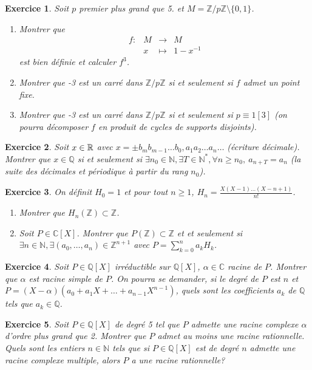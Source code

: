 \documentclass[12pt]{article}
\newtheorem{exercise}{Exercice}[section]
\theoremstyle{remark}
\theoremstyle{remark}
\newcommand{\C}{\mathbb{C}} \newcommand{\Q}{\mathbb{Q}}
\newcommand{\N}{\mathbb{N}} \newcommand{\Z}{\mathbb{Z}}
\newcommand{\function}[5]{
	$$
	\begin{array}{rccl}
		#1: & #2 & \to & #3 \\
		& #4 & \mapsto & #5
	\end{array}
	$$
}
\begin{document}
\begin{exercise}
	Soit $p$ premier plus grand que 5. et $M=\Z/p\Z\setminus\{0,1\}$.
	\begin{enumerate}
		\item
		Montrer que \function{f}{M}{M}{x}{1-x^{-1}} est bien définie et calculer
		$f^{3}$.
		\item
		Montrer que -3 est un carré dans $\Z/p\Z$ si et seulement si $f$ admet un
		point fixe.
		\item
		Montrer que -3 est un carré dans $\Z/p\Z$ si et seulement si $p\equiv
		1[3]$ (on pourra décomposer $f$ en produit de cycles de supports
		disjoints).
	\end{enumerate}
\end{exercise}

\begin{exercise}
	Soit $x\in\mathbb{R}$ avec $x=\pm b_{m}b_{m-1}\dots b_{0},a_{1}a_{2}\dots a_{n}\dots$
	(écriture décimale). Montrer que $x\in\Q$ si et seulement si $\exists
	n_{0}\in\N,\exists T\in\N^{*},\forall n\geqslant n_{0},~a_{n+T}=a_{n}$ (la
	suite des décimales et périodique à partir du rang $n_{0}$).
\end{exercise}

\begin{exercise}
	On définit $H_{0}=1$ et pour tout $n\geqslant1$,
	$H_{n}=\frac{X(X-1)\dots(X-n+1)}{n!}$.
	\begin{enumerate}
		\item
		Montrer que $H_{n}(\Z)\subset\Z$.
		\item
		Soit $P\in\C[X]$. Montrer que $P(\Z)\subset\Z$ et et seulement si $\exists
		n\in\N,\exists(a_{0},\dots,a_{n})\in\Z^{n+1}$ avec
		$P=\sum_{k=0}^{n}a_{k}H_{k}$.
	\end{enumerate}
\end{exercise}

\begin{exercise}
	Soit $P\in\Q[X]$ irréductible sur $\Q[X]$, $\alpha\in\C$ racine de $P$.
	Montrer que $\alpha$ est racine simple de $P$. On pourra se demander, si le
	degré de $P$ est $n$ et $P=(X-\alpha)(a_{0}+a_{1}X+\dots+a_{n-1}X^{n-1})$,
	quels sont les coefficients $a_{k}$ de $\Q$ tels que $a_{k}\in\Q$.
\end{exercise}

\begin{exercise}
	Soit $P\in\Q[X]$ de degré 5 tel que $P$ admette une racine complexe $\alpha$
	d'ordre plus grand que 2. Montrer que $P$ admet au moins une racine
	rationnelle. Quels sont les entiers $n\in\N$ tels que si $P\in\Q[X]$ est de
	degré $n$ admette une racine complexe multiple, alors $P$ a une racine
	rationnelle?
\end{exercise}
\end{document}
